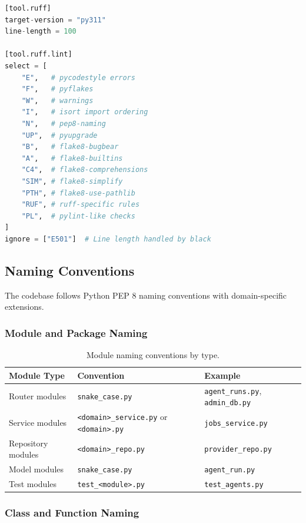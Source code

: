 \begin{lstlisting}[language=Python, caption={Ruff lint rules configuration.}]
[tool.ruff]
target-version = "py311"
line-length = 100

[tool.ruff.lint]
select = [
    "E",   # pycodestyle errors
    "F",   # pyflakes
    "W",   # warnings
    "I",   # isort import ordering
    "N",   # pep8-naming
    "UP",  # pyupgrade
    "B",   # flake8-bugbear
    "A",   # flake8-builtins
    "C4",  # flake8-comprehensions
    "SIM", # flake8-simplify
    "PTH", # flake8-use-pathlib
    "RUF", # ruff-specific rules
    "PL",  # pylint-like checks
]
ignore = ["E501"]  # Line length handled by black
\end{lstlisting}

\subsection{Naming Conventions}

The codebase follows Python PEP 8 naming conventions with domain-specific extensions.

\subsubsection{Module and Package Naming}

\begin{table}[ht]
\centering
\caption{Module naming conventions by type.}
\label{tab:module-naming}
\small
\begin{tabular}{lll}
\hline
\textbf{Module Type} & \textbf{Convention} & \textbf{Example} \\
\hline
Router modules & \texttt{snake\_case.py} & \texttt{agent\_runs.py}, \texttt{admin\_db.py} \\
Service modules & \texttt{<domain>\_service.py} or \texttt{<domain>.py} & \texttt{jobs\_service.py} \\
Repository modules & \texttt{<domain>\_repo.py} & \texttt{provider\_repo.py} \\
Model modules & \texttt{snake\_case.py} & \texttt{agent\_run.py} \\
Test modules & \texttt{test\_<module>.py} & \texttt{test\_agents.py} \\
\hline
\end{tabular}
\end{table}

\subsubsection{Class and Function Naming}

